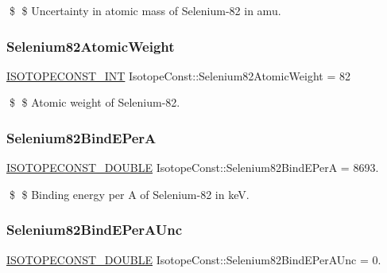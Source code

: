 \$ \$ Uncertainty in atomic mass of Selenium-\/82 in amu. \mbox{\label{group___isotope_const-_selenium-_se82_ga28967a9a2c307d061bfd71a9a332f511}} 
\subsubsection{\texorpdfstring{Selenium82\+Atomic\+Weight}{Selenium82AtomicWeight}}
{\footnotesize\ttfamily \mbox{\hyperlink{group___isotope_const-_macros_ga5f18360b3e99483a35c32d789e62621c}{I\+S\+O\+T\+O\+P\+E\+C\+O\+N\+S\+T\+\_\+\+I\+NT}} Isotope\+Const\+::\+Selenium82\+Atomic\+Weight = 82}

\$ \$ Atomic weight of Selenium-\/82. \mbox{\label{group___isotope_const-_selenium-_se82_ga30b94367b4b6f26e2409717985e87a25}} 
\subsubsection{\texorpdfstring{Selenium82\+Bind\+E\+PerA}{Selenium82BindEPerA}}
{\footnotesize\ttfamily \mbox{\hyperlink{group___isotope_const-_macros_ga8f45a7272ce02c0b4c65c44636ed719a}{I\+S\+O\+T\+O\+P\+E\+C\+O\+N\+S\+T\+\_\+\+D\+O\+U\+B\+LE}} Isotope\+Const\+::\+Selenium82\+Bind\+E\+PerA = 8693.}

\$ \$ Binding energy per A of Selenium-\/82 in keV. \mbox{\label{group___isotope_const-_selenium-_se82_ga966981dd3e34814e9c7b18c5cb5135aa}} 
\subsubsection{\texorpdfstring{Selenium82\+Bind\+E\+Per\+A\+Unc}{Selenium82BindEPerAUnc}}
{\footnotesize\ttfamily \mbox{\hyperlink{group___isotope_const-_macros_ga8f45a7272ce02c0b4c65c44636ed719a}{I\+S\+O\+T\+O\+P\+E\+C\+O\+N\+S\+T\+\_\+\+D\+O\+U\+B\+LE}} Isotope\+Const\+::\+Selenium82\+Bind\+E\+Per\+A\+Unc = 0.}

